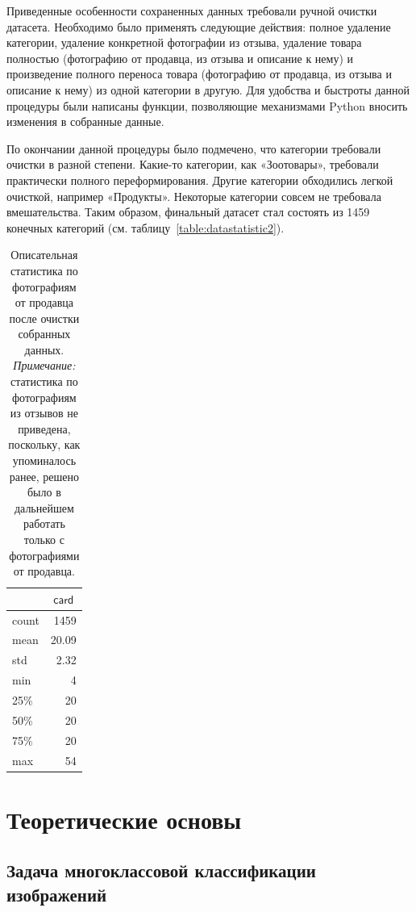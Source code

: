 \documentclass[a4paper,12pt]{extarticle}
\begin{document}
Приведенные особенности сохраненных данных требовали ручной очистки датасета. Необходимо было применять следующие действия: полное удаление категории, удаление конкретной фотографии из отзыва, удаление товара полностью (фотографию от продавца, из отзыва и описание к нему) и произведение полного переноса товара (фотографию от продавца, из отзыва и описание к нему) из одной категории в другую. Для удобства и быстроты данной процедуры были написаны функции, позволяющие механизмами Python вносить изменения в собранные данные.

По окончании данной процедуры было подмечено, что категории требовали очистки в разной степени. Какие-то категории, как «Зоотовары», требовали практически полного переформирования. Другие категории обходились легкой очисткой, например «Продукты». Некоторые категории совсем не требовала вмешательства. Таким образом, финальный датасет стал состоять из 1459 конечных категорий (см. таблицу~\ref{table:datastatistic2}).

\begin{table}[ht]
	\caption{Описательная статистика по фотографиям от продавца после очистки собранных данных. \textsl{Примечание:} статистика по фотографиям из отзывов не приведена, поскольку, как упоминалось ранее, решено было в дальнейшем работать только с фотографиями от продавца.}
	\label{table:datastatistic3}
	\footnotesize
	\centering
	\begin{tabular}{l|r}
		\toprule
		{} & \multicolumn{1}{c}{$\mathsf{card}$}\\
		\midrule
		count &	1459\\
		mean  & 20.09\\
		std   & 2.32\\
		min   &	4\\
		25\%  &	20\\
		50\%  &	20\\
		75\%  &	20\\
		max   &	54 \\
		\bottomrule
	\end{tabular}
\end{table}

\newpage
\section{Теоретические основы} 

\subsection{Задача многоклассовой классификации изображений}
\end{document}
